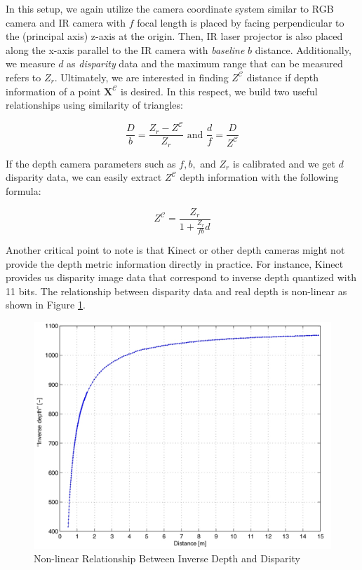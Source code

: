 \documentclass[a4paper]{report}
\numberwithin{figure}{section}
\begin{document}
In this setup, we again utilize the camera coordinate system similar to RGB 
camera and IR camera with $f$ focal length is placed by facing perpendicular 
to the (principal axis) z-axis at the origin. Then, IR laser projector is also 
placed along the x-axis parallel to the IR camera with \textit{baseline} 
$b$ distance.  
Additionally, we measure $d$ as \textit{disparity} data and the maximum 
range that can be measured refers to $Z_r$. Ultimately, we are interested in 
finding $Z^{\mathcal{C}}$ distance if depth information of a point 
$\mathbf{X}^{\mathcal{C}}$ is 
desired. In this respect, we build two useful relationships using similarity 
of 
triangles:


\begin{equation}
  \frac{D}{b} = \frac{Z_r - Z^{\mathcal{C}}}{Z_r} \text{ and } \frac{d}{f} = 
  \frac{D}{Z^{\mathcal{C}}}
\end{equation}

If the depth camera parameters such as $f, b,$ and $Z_r$ is calibrated and we 
get $d$ disparity data, we can easily extract $Z^{\mathcal{C}}$ depth 
information with the 
following formula:

\begin{equation}\label{eq:depth_wo_disparity}
  Z^{\mathcal{C}} = \frac{Z_r}{1+\frac{Z_r}{fb}d}
\end{equation}

Another critical point to note is that Kinect or other depth cameras might not 
provide the depth metric information directly in practice. For instance, 
Kinect provides us disparity image data that correspond to inverse depth 
quantized with 11 bits. The relationship between disparity data and real 
depth is non-linear as shown in Figure \ref{fig:depth_disparity_relation}.

\begin{figure}[H]
	\centering
  \includegraphics[width=0.6\linewidth,natwidth=640,natheight=640]
  {fig/ref_imgs/depth_disparity_relation.png}
  \caption[Relationship Between Inverse Depth and Disparity]{Non-linear 
  Relationship Between Inverse Depth and Disparity \parencite{Smisek2011}}
	\label{fig:depth_disparity_relation}
\end{figure}
\end{document}
